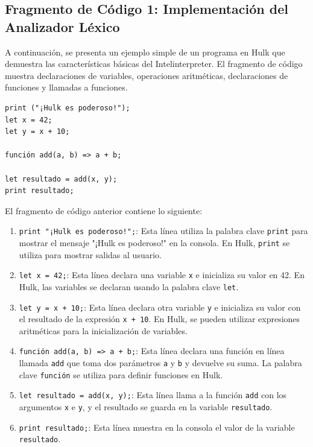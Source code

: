\documentclass{article}
\begin{document}
\subsection{Fragmento de Código 1: Implementación del Analizador Léxico}

A continuación, se presenta un ejemplo simple de un programa en Hulk que demuestra las características básicas del Intelinterpreter. El fragmento de código muestra declaraciones de variables, operaciones aritméticas, declaraciones de funciones y llamadas a funciones.

\begin{verbatim}
print ("¡Hulk es poderoso!");
let x = 42;
let y = x + 10;

función add(a, b) => a + b;

let resultado = add(x, y);
print resultado;
\end{verbatim}

El fragmento de código anterior contiene lo siguiente:

\begin{enumerate}
    \item \texttt{print "¡Hulk es poderoso!";}: Esta línea utiliza la palabra clave \texttt{print} para mostrar el mensaje "¡Hulk es poderoso!" en la consola. En Hulk, \texttt{print} se utiliza para mostrar salidas al usuario.

    \item \texttt{let x = 42;}: Esta línea declara una variable \texttt{x} e inicializa su valor en 42. En Hulk, las variables se declaran usando la palabra clave \texttt{let}.

    \item \texttt{let y = x + 10;}: Esta línea declara otra variable \texttt{y} e inicializa su valor con el resultado de la expresión \texttt{x + 10}. En Hulk, se pueden utilizar expresiones aritméticas para la inicialización de variables.

    \item \texttt{función add(a, b) => a + b;}: Esta línea declara una función en línea llamada \texttt{add} que toma dos parámetros \texttt{a} y \texttt{b} y devuelve su suma. La palabra clave \texttt{función} se utiliza para definir funciones en Hulk.

    \item \texttt{let resultado = add(x, y);}: Esta línea llama a la función \texttt{add} con los argumentos \texttt{x} e \texttt{y}, y el resultado se guarda en la variable \texttt{resultado}.

    \item \texttt{print resultado;}: Esta línea muestra en la consola el valor de la variable \texttt{resultado}.
\end{enumerate}
\end{document}
